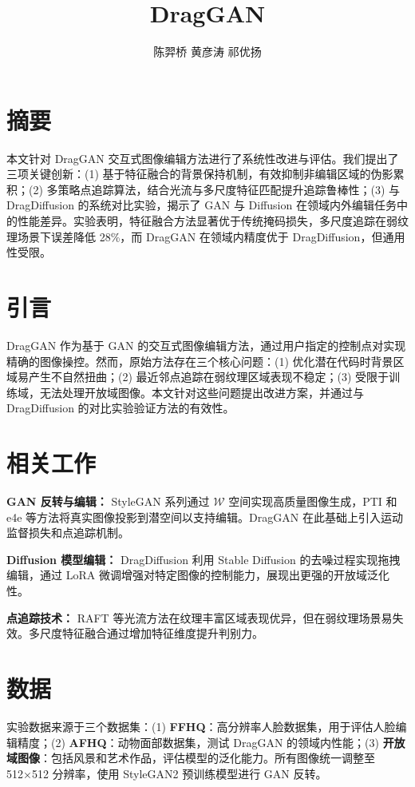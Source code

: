 \documentclass[a4paper,10pt]{ctexart}
\title{\textbf{DragGAN}}
\author{陈羿桥 \quad 黄彦涛 \quad 祁优扬}
\date{}
\begin{document}
\maketitle
\vspace{-10pt}

\section*{摘要}
本文针对 DragGAN 交互式图像编辑方法进行了系统性改进与评估。我们提出了三项关键创新：(1) 基于特征融合的背景保持机制，有效抑制非编辑区域的伪影累积；(2) 多策略点追踪算法，结合光流与多尺度特征匹配提升追踪鲁棒性；(3) 与 DragDiffusion 的系统对比实验，揭示了 GAN 与 Diffusion 在领域内外编辑任务中的性能差异。实验表明，特征融合方法显著优于传统掩码损失，多尺度追踪在弱纹理场景下误差降低 28\%，而 DragGAN 在领域内精度优于 DragDiffusion，但通用性受限。

\section{引言}
DragGAN 作为基于 GAN 的交互式图像编辑方法，通过用户指定的控制点对实现精确的图像操控。然而，原始方法存在三个核心问题：(1) 优化潜在代码时背景区域易产生不自然扭曲；(2) 最近邻点追踪在弱纹理区域表现不稳定；(3) 受限于训练域，无法处理开放域图像。本文针对这些问题提出改进方案，并通过与 DragDiffusion 的对比实验验证方法的有效性。

\section{相关工作}
\textbf{GAN 反转与编辑：} StyleGAN 系列通过 $\mathcal{W}$ 空间实现高质量图像生成，PTI 和 e4e 等方法将真实图像投影到潜空间以支持编辑。DragGAN 在此基础上引入运动监督损失和点追踪机制。

\textbf{Diffusion 模型编辑：} DragDiffusion 利用 Stable Diffusion 的去噪过程实现拖拽编辑，通过 LoRA 微调增强对特定图像的控制能力，展现出更强的开放域泛化性。

\textbf{点追踪技术：} RAFT 等光流方法在纹理丰富区域表现优异，但在弱纹理场景易失效。多尺度特征融合通过增加特征维度提升判别力。

\section{数据}
实验数据来源于三个数据集：(1) \textbf{FFHQ}：高分辨率人脸数据集，用于评估人脸编辑精度；(2) \textbf{AFHQ}：动物面部数据集，测试 DragGAN 的领域内性能；(3) \textbf{开放域图像}：包括风景和艺术作品，评估模型的泛化能力。所有图像统一调整至 512×512 分辨率，使用 StyleGAN2 预训练模型进行 GAN 反转。
\end{document}
